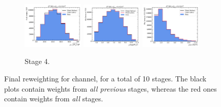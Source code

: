 \begin{figure}[htb]
    \begin{subfigure}{\textwidth}
        \centering
        \includegraphics[width=0.32\textwidth]{./figs-mc-correction/reweighting-final/plot_step4-D0_iso-mu_comp.pdf}
        \includegraphics[width=0.32\textwidth]{./figs-mc-correction/reweighting-final/plot_step4-D0_iso-mu_log_ip_chi2.pdf}
        \includegraphics[width=0.32\textwidth]{./figs-mc-correction/reweighting-final/plot_step4-D0_iso-mu_pt.pdf}
        \caption{Stage 4.}
    \end{subfigure}

    \caption{
        Final reweighting for \Dz channel, for a total of 10 stages.
        The black plots contain weights from \emph{all previous} stages,
        whereas the red ones contain weights from \emph{all} stages.
    }
    \label{fig:final-rwt-d0}
\end{figure}

